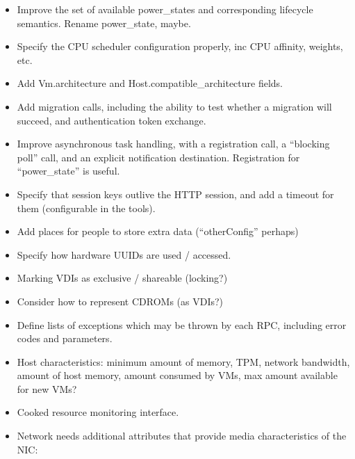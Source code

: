 \begin{itemize}

\item Improve the set of available power\_states and corresponding lifecycle
semantics.  Rename power\_state, maybe.

\item Specify the CPU scheduler configuration properly, inc CPU affinity,
weights, etc.

\item Add Vm.architecture and Host.compatible\_architecture fields.

\item Add migration calls, including the ability to test whether a migration
will succeed, and authentication token exchange.

\item Improve asynchronous task handling, with a registration call, a
``blocking poll'' call, and an explicit notification destination.  Registration
for ``power\_state'' is useful.

\item Specify that session keys outlive the HTTP session, and add a timeout
for them (configurable in the tools).

\item Add places for people to store extra data (``otherConfig'' perhaps)

\item Specify how hardware UUIDs are used / accessed.

\item Marking VDIs as exclusive / shareable (locking?)

\item Consider how to represent CDROMs (as VDIs?)

\item Define lists of exceptions which may be thrown by each RPC, including
error codes and parameters.

\item Host characteristics: minimum amount of memory, TPM, network bandwidth,
amount of host memory, amount consumed by VMs, max amount available for new
VMs?

\item Cooked resource monitoring interface.

\item Network needs additional attributes that provide media characteristics
of the NIC:

\begin{itemize}


\end{itemize}
\end{itemize}
